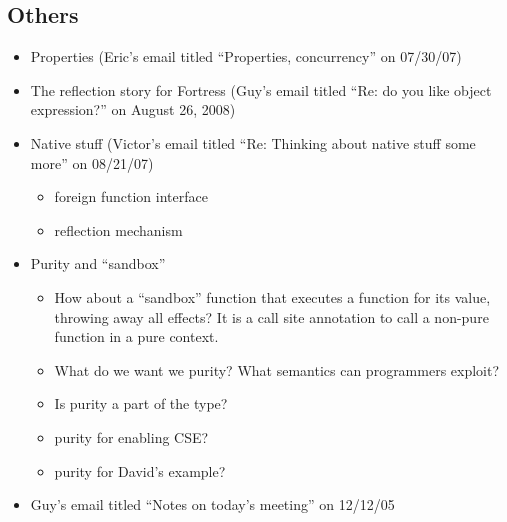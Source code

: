 \subsection{Others}
\begin{itemize}
\item Properties (Eric's email titled ``Properties, concurrency'' on 07/30/07)

\item The reflection story for Fortress (Guy's email titled ``Re: do you like object expression?'' on August 26, 2008)

\item Native stuff (Victor's email titled ``Re: Thinking about native stuff some more'' on 08/21/07)
  \begin{itemize}
  \item foreign function interface
  \item reflection mechanism
  \end{itemize}

\item Purity and ``sandbox''
  \begin{itemize}
  \item How about a ``sandbox'' function that executes a function for its
  value, throwing away all effects?  It is a call site annotation to call
  a non-pure function in a pure context.
  \item What do we want we purity?  What semantics can programmers exploit?
  \item Is purity a part of the type?
  \item purity for enabling CSE?
  \item purity for David's example?
  \end{itemize}

\item {}

Guy's email titled ``Notes on today's meeting'' on 12/12/05


\end{itemize}
